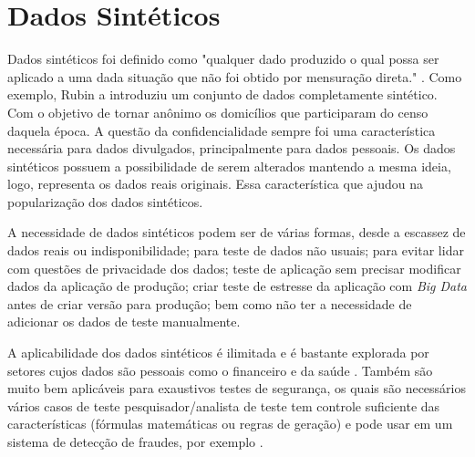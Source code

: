 \documentclass[
	12pt,				%
	openright,			%
	oneside,			%
	a4paper,			%
	english,			%
	brazil				%
	]{abntex2}
\begin{document}

	\section{Dados Sintéticos}
		Dados sintéticos foi definido como "qualquer dado produzido o qual possa ser aplicado a uma dada situação que não foi obtido por mensuração direta." \cite{mcgraw-hilleducation2016}.
		Como exemplo, Rubin \cite{rubin1993statistical} a introduziu um conjunto de dados completamente sintético.
		Com o objetivo de tornar anônimo os domicílios que participaram do censo daquela época.
		A questão da confidencialidade sempre foi uma característica necessária para dados divulgados, principalmente para dados pessoais.
		Os dados sintéticos possuem a possibilidade de serem alterados mantendo a mesma ideia, logo, representa os dados reais originais.
		Essa característica que ajudou na popularização dos dados sintéticos.
		\par
		A necessidade de dados sintéticos podem ser de várias formas, 
		desde a escassez de dados reais ou indisponibilidade;
		para teste de dados não usuais;
		para evitar lidar com questões de privacidade dos dados;
		teste de aplicação sem precisar modificar dados da aplicação de produção;
		criar teste de estresse da aplicação com \emph{Big Data} antes de criar versão para produção;
		bem como não ter a necessidade de adicionar os dados de teste manualmente. \cite{top15DatagenTools2019}
		\par
		A aplicabilidade dos dados sintéticos é ilimitada e é bastante explorada por setores cujos dados são pessoais como o financeiro \cite{lopez2012money} e da saúde \cite{bergeat2014french}.	
		Também são muito bem aplicáveis para exaustivos testes de segurança, os quais são necessários vários casos de teste
		pesquisador/analista de teste tem controle suficiente das características (fórmulas matemáticas ou regras de geração) e pode usar em um sistema de detecção de fraudes, por exemplo \cite{barse2003synthesizing}.
		
	
\end{document}
